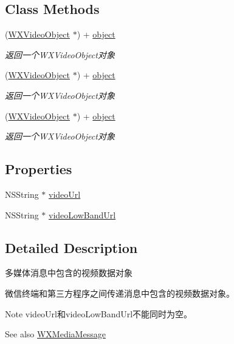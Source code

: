 \subsection*{Class Methods}
\begin{DoxyCompactItemize}
\item 
(\mbox{\hyperlink{interface_w_x_video_object}{W\+X\+Video\+Object}} $\ast$) + \mbox{\hyperlink{interface_w_x_video_object_a096b36e4ee7e9f683f8b131d40f9bd6a}{object}}
\begin{DoxyCompactList}\small\item\em 返回一个\+W\+X\+Video\+Object对象 \end{DoxyCompactList}\item 
(\mbox{\hyperlink{interface_w_x_video_object}{W\+X\+Video\+Object}} $\ast$) + \mbox{\hyperlink{interface_w_x_video_object_a096b36e4ee7e9f683f8b131d40f9bd6a}{object}}
\begin{DoxyCompactList}\small\item\em 返回一个\+W\+X\+Video\+Object对象 \end{DoxyCompactList}\item 
(\mbox{\hyperlink{interface_w_x_video_object}{W\+X\+Video\+Object}} $\ast$) + \mbox{\hyperlink{interface_w_x_video_object_a096b36e4ee7e9f683f8b131d40f9bd6a}{object}}
\begin{DoxyCompactList}\small\item\em 返回一个\+W\+X\+Video\+Object对象 \end{DoxyCompactList}\end{DoxyCompactItemize}
\subsection*{Properties}
\begin{DoxyCompactItemize}
\item 
N\+S\+String $\ast$ \mbox{\hyperlink{interface_w_x_video_object_ad830b0c9c0e4afae7a75d14e0ab130d3}{video\+Url}}
\item 
N\+S\+String $\ast$ \mbox{\hyperlink{interface_w_x_video_object_aaed3f2fe0eb30e7491441b3e13b4977d}{video\+Low\+Band\+Url}}
\end{DoxyCompactItemize}


\subsection{Detailed Description}
多媒体消息中包含的视频数据对象 

微信终端和第三方程序之间传递消息中包含的视频数据对象。 \begin{DoxyNote}{Note}
video\+Url和video\+Low\+Band\+Url不能同时为空。 
\end{DoxyNote}
\begin{DoxySeeAlso}{See also}
\mbox{\hyperlink{interface_w_x_media_message}{W\+X\+Media\+Message}} 
\end{DoxySeeAlso}


